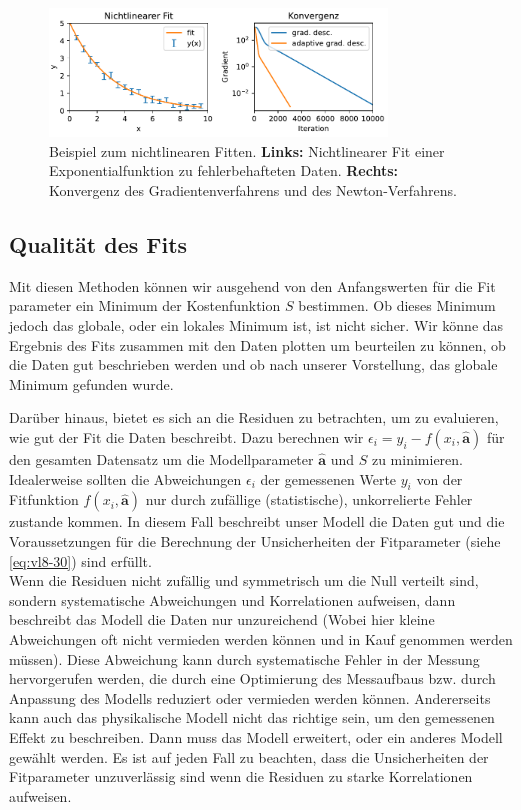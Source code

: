 \begin{figure}[tbp]
    \centering
        \includegraphics[width=0.8\textwidth]{Figures/nonlinear_fitting_image.pdf}
        \caption{Beispiel zum nichtlinearen Fitten. \textbf{Links:} Nichtlinearer Fit einer Exponentialfunktion zu fehlerbehafteten Daten. \textbf{Rechts:} Konvergenz des Gradientenverfahrens und des Newton-Verfahrens.  }
        \label{fig:nonlinearFit}
\end{figure} 

\subsection{Qualität des Fits}
\label{subsec:vl9-3}

Mit diesen Methoden können wir ausgehend von den Anfangswerten für die Fit parameter ein Minimum der Kostenfunktion $S$ bestimmen. Ob dieses Minimum jedoch das globale, oder ein lokales Minimum ist, ist nicht sicher. Wir könne das Ergebnis des Fits zusammen mit den Daten plotten um beurteilen zu können, ob die Daten gut beschrieben werden und ob nach unserer Vorstellung, das globale Minimum gefunden wurde.

Darüber hinaus, bietet es sich an die Residuen zu betrachten, um zu evaluieren, wie gut der Fit die Daten beschreibt. Dazu berechnen wir $\epsilon_i =y_i - f(x_i, \boldsymbol{\hat{a}})$ für den gesamten Datensatz um die Modellparameter $\boldsymbol{\hat{a}}$ und $S$ zu minimieren. Idealerweise sollten die Abweichungen $\epsilon_i$ der gemessenen Werte $y_i$ von der Fitfunktion $f(x_i, \boldsymbol{\hat{a}})$ nur durch zufällige (statistische), unkorrelierte Fehler zustande kommen. In diesem Fall beschreibt unser Modell die Daten gut und die Voraussetzungen für die Berechnung der Unsicherheiten der Fitparameter (siehe \cref{eq:vl8-30}) sind erfüllt.\\
Wenn die Residuen nicht zufällig und symmetrisch um die Null verteilt sind, sondern systematische Abweichungen und Korrelationen aufweisen, dann beschreibt das Modell die Daten nur unzureichend (Wobei hier kleine Abweichungen oft nicht vermieden werden können und in Kauf genommen werden müssen). Diese Abweichung kann durch systematische Fehler in der Messung hervorgerufen werden, die durch eine Optimierung des Messaufbaus bzw. durch Anpassung des Modells reduziert oder vermieden werden können. Andererseits kann auch das physikalische Modell nicht das richtige sein, um den gemessenen Effekt zu beschreiben. Dann muss das Modell erweitert, oder ein anderes Modell gewählt werden. Es ist auf jeden Fall zu beachten, dass die Unsicherheiten der Fitparameter unzuverlässig sind wenn die Residuen zu starke Korrelationen aufweisen.


